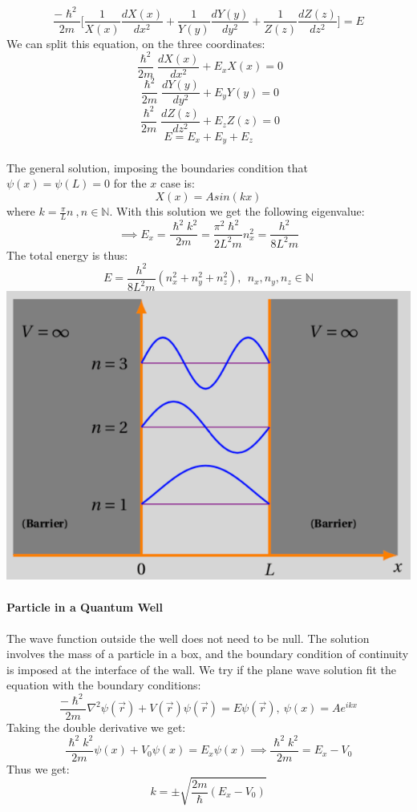 \documentclass{article}
\begin{document}
$$\frac{-\hslash^2}{2m} \Biggl[ \frac{1}{X(x)} \frac{dX(x)}{dx^2} + \frac{1}{Y(y)} \frac{dY(y)}{dy^2} + \frac{1}{Z(z)} \frac{dZ(z)}{dz^2} \Biggl]  = E$$
We can split this equation, on the three coordinates:
$$ \frac{\hslash^2}{2m} \frac{dX(x)}{dx^2} + E_x X(x) = 0$$
$$ \frac{\hslash^2}{2m} \frac{dY(y)}{dy^2} + E_y Y(y) = 0$$
$$ \frac{\hslash^2}{2m} \frac{dZ(z)}{dz^2} + E_z Z(z) = 0$$
$$E = E_x+E_y+E_z$$ \\
The general solution, imposing the boundaries condition that $\psi(x) = \psi(L) = 0 $ for the $x$ case is: 
$$X(x) = Asin(kx)$$
where $k =\frac{\pi}{L}n\ , n \in \mathbb{N}.$
With this solution we get the following eigenvalue:
$$\implies E_x = \frac{\hslash^2k^2}{2m} = \frac{\pi^2\hslash^2}{2L^2m}n_x^2 = \frac{h^2}{8L^2m}$$
The total energy is thus:
$$E = \frac{h^2}{8L^2m} (n_x^2+n_y^2+n_z^2), \ \ n_x,n_y,n_z \in \mathbb{N}$$
\includegraphics[scale = 0.4]{PIAB.png} \\ \\ 
\textbf{Particle in a Quantum Well}\\ \\ 
The wave function outside the well does not need to be null. The solution involves the mass of a particle in a box, and the boundary condition of continuity is imposed at the interface of the wall. 
We try if the plane wave solution fit the equation with the boundary conditions:
$$\frac{-\hslash^2}{2m} \nabla^2 \psi(\vec{r}) + V(\vec{r})\psi(\vec{r}) = E\psi(\vec{r}), \ \psi(x) = Ae^{ikx} $$
Taking the double derivative we get:
$$\frac{\hslash^2 k^2}{2m} \psi(x) + V_0 \psi(x) = E_x \psi(x) \implies \frac{\hslash^2 k^2}{2m} = E_x-V_0$$
Thus we get:
$$ k = \pm \sqrt{\frac{2m}{\hslash}(E_x-V_0)}$$
\end{document}
